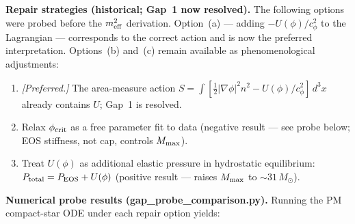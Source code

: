 \documentclass[10pt,twocolumn]{article}
\begin{document}
\textbf{Repair strategies (historical; Gap~1 now resolved).}
The following options were probed before the $m^2_{\rm eff}$ derivation.
Option~(a) — adding $-U(\phi)/c_\phi^2$ to the Lagrangian — corresponds to
the correct action and is now the preferred interpretation.  Options~(b) and~(c)
remain available as phenomenological adjustments:
\begin{enumerate}
  \item[(a)] \emph{[Preferred.]}  The area-measure action $S=\int[\tfrac{1}{2}|\nabla\phi|^2 n^2
        - U(\phi)/c_\phi^2]\,d^3x$ already contains $U$; Gap~1 is resolved.
  \item[(b)] Relax $\phi_{\rm crit}$ as a free parameter fit to data
        (negative result — see probe below; EOS stiffness, not cap, controls $M_{\rm max}$).
  \item[(c)] Treat $U(\phi)$ as additional elastic pressure in hydrostatic
        equilibrium: $P_{\rm total}=P_{\rm EOS}+U(\phi)$
        (positive result — raises $M_{\rm max}$ to $\sim 31\,M_\odot$).
\end{enumerate}

\textbf{Numerical probe results (gap\_probe\_comparison.py).}
Running the PM compact-star ODE under each repair option yields:
\end{document}
